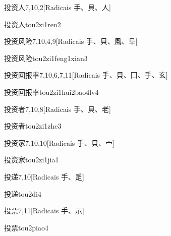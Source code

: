 \begin{entry}{投资人}{7,10,2}[Radicais ⼿、⾙、⼈]
  \begin{phonetics}{投资人}{tou2zi1ren2}
  \end{phonetics}
\end{entry}

\begin{entry}{投资风险}{7,10,4,9}[Radicais ⼿、⾙、⾵、⾩]
  \begin{phonetics}{投资风险}{tou2zi1feng1xian3}
  \end{phonetics}
\end{entry}

\begin{entry}{投资回报率}{7,10,6,7,11}[Radicais ⼿、⾙、⼞、⼿、⽞]
  \begin{phonetics}{投资回报率}{tou2zi1hui2bao4lv4}
  \end{phonetics}
\end{entry}

\begin{entry}{投资者}{7,10,8}[Radicais ⼿、⾙、⽼]
  \begin{phonetics}{投资者}{tou2zi1zhe3}
  \end{phonetics}
\end{entry}

\begin{entry}{投资家}{7,10,10}[Radicais ⼿、⾙、⼧]
  \begin{phonetics}{投资家}{tou2zi1jia1}
  \end{phonetics}
\end{entry}

\begin{entry}{投递}{7,10}[Radicais ⼿、⾡]
  \begin{phonetics}{投递}{tou2di4}
  \end{phonetics}
\end{entry}

\begin{entry}{投票}{7,11}[Radicais ⼿、⽰]
  \begin{phonetics}{投票}{tou2piao4}
  \end{phonetics}
\end{entry}

